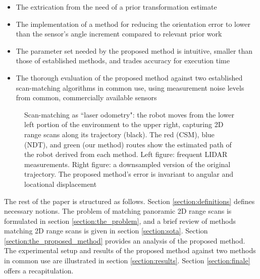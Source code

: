 \begin{itemize}
  \item The extrication from the need of a prior transformation estimate
  \item The implementation of a method for reducing the orientation error to
        lower than the sensor's angle increment compared to relevant prior work
  \item The parameter set needed by the proposed method is intuitive, smaller
        than those of established methods, and trades accuracy for execution
        time
  \item The thorough evaluation of the proposed method against two established
        scan-matching algorithms in common use, using measurement noise levels
        from common, commercially available sensors
\end{itemize}

\begin{figure}[]\centering
  \vspace{-1.7cm}
  
  \vspace{-2.3cm}
  \caption{\small Scan-matching as ``laser odometry": the robot moves from the
           lower left portion of the environment to the upper right, capturing
           2D range scans along its trajectory (black). The red (CSM), blue
           (NDT), and green (our method) routes show the estimated path of the
           robot derived from each method. Left figure: frequent LIDAR
           measurements.  Right figure: a downsampled version of the original
           trajectory. The proposed method's error is invariant to angular and
           locational displacement}
  \label{fig:laser_odometry}
\end{figure}

The rest of the paper is structured as follows. Section
\ref{section:definitions} defines necessary notions.  The problem of matching
panoramic 2D range scans is formulated in section \ref{section:the_problem},
and a brief review of methods matching 2D range scans is given in section
\ref{section:sota}. Section \ref{section:the_proposed_method} provides an
analysis of the proposed method. The experimental setup and results of the
proposed method against two methods in common use are illustrated in section
\ref{section:results}. Section \ref{section:finale} offers a recapitulation.
